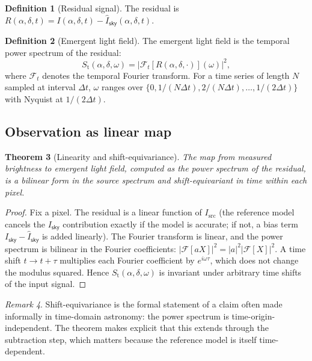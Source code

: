 \documentclass[11pt,twocolumn,a4paper]{article}
\newtheorem{theorem}{Theorem}[section]
\theoremstyle{definition}
\newtheorem{definition}[theorem]{Definition}
\theoremstyle{remark}
\newtheorem{remark}[theorem]{Remark}
\newcommand{\Sfield}{S_{\mathrm{t}}}
\newcommand{\RA}{\alpha}
\newcommand{\Dec}{\delta}
\newcommand{\sky}{\mathsf{sky}}
\newcommand{\src}{\mathrm{src}}
\begin{document}
\begin{definition}[Residual signal]
The residual is $R(\RA, \Dec, t) = I(\RA, \Dec, t) - \widehat{I}_\sky(\RA, \Dec, t)$.
\end{definition}

\begin{definition}[Emergent light field]
The emergent light field is the temporal power spectrum of the
residual:
\begin{equation}
\label{eq:field}
\Sfield(\RA, \Dec, \omega) = \left| \mathcal{F}_t [R(\RA, \Dec, \cdot)] (\omega) \right|^2,
\end{equation}
where $\mathcal{F}_t$ denotes the temporal Fourier transform. For a
time series of length $N$ sampled at interval $\Delta t$, $\omega$
ranges over $\{0, 1/(N\Delta t), 2/(N\Delta t), \ldots, 1/(2\Delta t)\}$
with Nyquist at $1/(2\Delta t)$.
\end{definition}

\subsection{Observation as linear map}

\begin{theorem}[Linearity and shift-equivariance]
\label{thm:linear}
The map from measured brightness to emergent light field, computed as
the power spectrum of the residual, is a bilinear form in the source
spectrum and shift-equivariant in time within each pixel.
\end{theorem}

\begin{proof}
Fix a pixel. The residual is a linear function of $I_\src$ (the
reference model cancels the $I_\sky$ contribution exactly if the model
is accurate; if not, a bias term $I_\sky - \widehat{I}_\sky$ is added
linearly). The Fourier transform is linear, and the power spectrum is
bilinear in the Fourier coefficients: $|\mathcal{F}[aX]|^2 = |a|^2 |\mathcal{F}[X]|^2$.
A time shift $t \to t + \tau$ multiplies each Fourier coefficient by
$e^{i\omega\tau}$, which does not change the modulus squared. Hence
$\Sfield(\RA, \Dec, \omega)$ is invariant under arbitrary time shifts
of the input signal.
\end{proof}

\begin{remark}
Shift-equivariance is the formal statement of a claim often made
informally in time-domain astronomy: the power spectrum is
time-origin-independent. The theorem makes explicit that this
extends through the subtraction step, which matters because the
reference model is itself time-dependent.
\end{remark}
\end{document}
